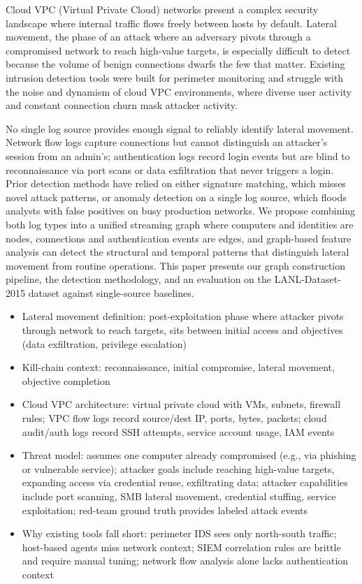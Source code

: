 \documentclass[letterpaper,twocolumn,10pt]{article}
\begin{document}
Cloud VPC (Virtual Private Cloud) networks present a complex security landscape where internal traffic flows freely between hosts by default. Lateral movement, the phase of an attack where an adversary pivots through a compromised network to reach high-value targets, is especially difficult to detect because the volume of benign connections dwarfs the few that matter. Existing intrusion detection tools were built for perimeter monitoring and struggle with the noise and dynamism of cloud VPC environments, where diverse user activity and constant connection churn mask attacker activity.

No single log source provides enough signal to reliably identify lateral movement. Network flow logs capture connections but cannot distinguish an attacker's session from an admin's; authentication logs record login events but are blind to reconnaissance via port scans or data exfiltration that never triggers a login. Prior detection methods have relied on either signature matching, which misses novel attack patterns, or anomaly detection on a single log source, which floods analysts with false positives on busy production networks. We propose combining both log types into a unified streaming graph where computers and identities are nodes, connections and authentication events are edges, and graph-based feature analysis can detect the structural and temporal patterns that distinguish lateral movement from routine operations. This paper presents our graph construction pipeline, the detection methodology, and an evaluation on the LANL-Dataset-2015 dataset against single-source baselines.

\begin{itemize}
\item Lateral movement definition: post-exploitation phase where attacker pivots through network to reach targets, sits between initial access and objectives (data exfiltration, privilege escalation)
\item Kill-chain context: reconnaissance, initial compromise, lateral movement, objective completion
\item Cloud VPC architecture: virtual private cloud with VMs, subnets, firewall rules; VPC flow logs record source/dest IP, ports, bytes, packets; cloud audit/auth logs record SSH attempts, service account usage, IAM events
\item Threat model: assumes one computer already compromised (e.g., via phishing or vulnerable service); attacker goals include reaching high-value targets, expanding access via credential reuse, exfiltrating data; attacker capabilities include port scanning, SMB lateral movement, credential stuffing, service exploitation; red-team ground truth provides labeled attack events
\item Why existing tools fall short: perimeter IDS sees only north-south traffic; host-based agents miss network context; SIEM correlation rules are brittle and require manual tuning; network flow analysis alone lacks authentication context
\end{itemize}
\end{document}
